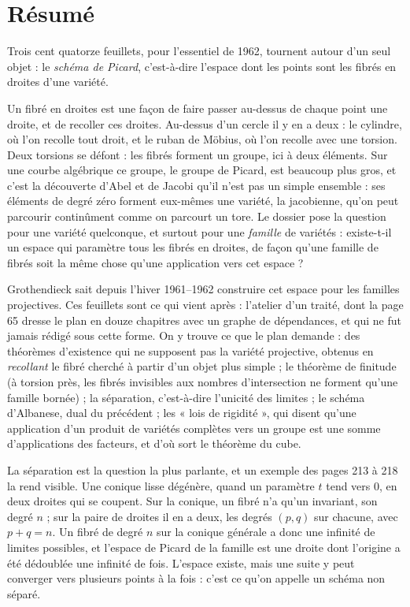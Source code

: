 \documentclass[11pt,a4paper]{article}
\begin{document}
\section*{Résumé}

\begin{resume}
Trois cent quatorze feuillets, pour l'essentiel de 1962, tournent autour d'un
seul objet : le \emph{schéma de Picard}, c'est-à-dire l'espace dont les points
sont les fibrés en droites d'une variété.

Un fibré en droites est une façon de faire passer au-dessus de chaque point
une droite, et de recoller ces droites. Au-dessus d'un cercle il y en a deux :
le cylindre, où l'on recolle tout droit, et le ruban de Möbius, où l'on
recolle avec une torsion. Deux torsions se défont : les fibrés forment un
groupe, ici à deux éléments. Sur une courbe algébrique ce groupe, le groupe de
Picard, est beaucoup plus gros, et c'est la découverte d'Abel et de Jacobi
qu'il n'est pas un simple ensemble : ses éléments de degré zéro forment
eux-mêmes une variété, la jacobienne, qu'on peut parcourir continûment comme
on parcourt un tore. Le dossier pose la question pour une variété quelconque,
et surtout pour une \emph{famille} de variétés : existe-t-il un espace qui
paramètre tous les fibrés en droites, de façon qu'une famille de fibrés soit la
même chose qu'une application vers cet espace ?

Grothendieck sait depuis l'hiver 1961--1962 construire cet espace pour les
familles projectives. Ces feuillets sont ce qui vient après : l'atelier d'un
traité, dont la page 65 dresse le plan en douze chapitres avec un graphe de
dépendances, et qui ne fut jamais rédigé sous cette forme. On y trouve ce que
le plan demande : des théorèmes d'existence qui ne supposent pas la variété
projective, obtenus en \emph{recollant} le fibré cherché à partir d'un objet
plus simple ; le théorème de finitude (à torsion près, les fibrés invisibles
aux nombres d'intersection ne forment qu'une famille bornée) ; la séparation,
c'est-à-dire l'unicité des limites ; le schéma d'Albanese, dual du précédent ;
les « lois de rigidité », qui disent qu'une application d'un produit de
variétés complètes vers un groupe est une somme d'applications des facteurs,
et d'où sort le théorème du cube.

La séparation est la question la plus parlante, et un exemple des pages 213 à
218 la rend visible. Une conique lisse dégénère, quand un paramètre $t$ tend
vers $0$, en deux droites qui se coupent. Sur la conique, un fibré n'a qu'un
invariant, son degré $n$ ; sur la paire de droites il en a deux, les degrés
$(p, q)$ sur chacune, avec $p + q = n$. Un fibré de degré $n$ sur la conique
générale a donc une infinité de limites possibles, et l'espace de Picard de la
famille est une droite dont l'origine a été dédoublée une infinité de fois.
L'espace existe, mais une suite y peut converger vers plusieurs points à la
fois : c'est ce qu'on appelle un schéma non séparé.


\end{resume}
\end{document}
